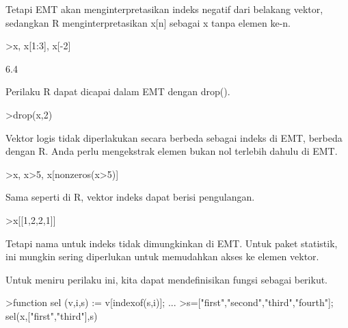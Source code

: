 \documentclass{article}
\begin{document}
\begin{eulernotebook}
\begin{eulercomment}
\begin{eulercomment}
\begin{eulercomment}
Tetapi EMT akan menginterpretasikan indeks negatif dari belakang
vektor, sedangkan R menginterpretasikan x[n] sebagai x tanpa elemen
ke-n.
\end{eulercomment}
\begin{eulerprompt}
>x, x[1:3], x[-2]
\end{eulerprompt}
\begin{euleroutput}
  [10.4,  5.6,  3.1,  6.4,  21.7]
  [10.4,  5.6,  3.1]
  6.4
\end{euleroutput}
\begin{eulercomment}
Perilaku R dapat dicapai dalam EMT dengan drop().
\end{eulercomment}
\begin{eulerprompt}
>drop(x,2)
\end{eulerprompt}
\begin{euleroutput}
  [10.4,  3.1,  6.4,  21.7]
\end{euleroutput}
\begin{eulercomment}
Vektor logis tidak diperlakukan secara berbeda sebagai indeks di EMT,
berbeda dengan R. Anda perlu mengekstrak elemen bukan nol terlebih
dahulu di EMT.
\end{eulercomment}
\begin{eulerprompt}
>x, x>5, x[nonzeros(x>5)]
\end{eulerprompt}
\begin{euleroutput}
  [10.4,  5.6,  3.1,  6.4,  21.7]
  [1,  1,  0,  1,  1]
  [10.4,  5.6,  6.4,  21.7]
\end{euleroutput}
\begin{eulercomment}
Sama seperti di R, vektor indeks dapat berisi pengulangan.
\end{eulercomment}
\begin{eulerprompt}
>x[[1,2,2,1]]
\end{eulerprompt}
\begin{euleroutput}
  [10.4,  5.6,  5.6,  10.4]
\end{euleroutput}
\begin{eulercomment}
Tetapi nama untuk indeks tidak dimungkinkan di EMT. Untuk paket
statistik, ini mungkin sering diperlukan untuk memudahkan akses ke
elemen vektor.

Untuk meniru perilaku ini, kita dapat mendefinisikan fungsi sebagai
berikut.
\end{eulercomment}
\begin{eulerprompt}
>function sel (v,i,s) := v[indexof(s,i)]; ...
>s=["first","second","third","fourth"]; sel(x,["first","third"],s)
\end{eulerprompt}
\begin{euleroutput}
  

\end{euleroutput}
\end{eulercomment}
\end{eulercomment}
\end{eulernotebook}
\end{document}
